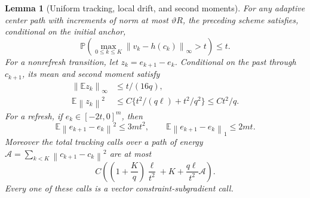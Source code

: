 \documentclass[11pt,a4paper]{article}
\newcommand{\E}{\mathbb E}
\newcommand{\Pp}{\mathbb P}
\newcommand{\norm}[1]{\left\lVert#1\right\rVert}
\newtheorem{lemma}[theorem]{Lemma}
\theoremstyle{remark}
\numberwithin{equation}{section}
\begin{document}
\begin{lemma}[Uniform tracking, local drift, and second moments]\label{lem:tracker}
For any adaptive center path with increments of norm at most $\vartheta R$, the preceding scheme satisfies, conditional on the initial anchor,
\begin{equation}
 \Pp\left(\max_{0\le k\le K}\norm{v_k-h(c_k)}_\infty>t\right)\le t.
 \label{eq:trackgood}
\end{equation}
For a nonrefresh transition, let $z_k=e_{k+1}-e_k$. Conditional on the past through $c_{k+1}$, its mean and second moment satisfy
\begin{align}
 \norm{\E z_k}_\infty&\le t/(16q),\label{eq:bias}\\
 \E\norm{z_k}^2&\le C\{t^2/(q\ell)+t^2/q^2\}\le Ct^2/q.
 \label{eq:incrementsecond}
\end{align}
For a refresh, if $e_k\in[-2t,0]^m$, then
\[
 \E\norm{e_{k+1}-e_k}^2\le3mt^2,
 \qquad \E\norm{e_{k+1}-e_k}_1\le2mt.
\]
Moreover the total tracking calls over a path of energy $\mathcal A=\sum_{k<K}\norm{c_{k+1}-c_k}^2$ are at most
\begin{equation}
 C\left(\left(1+\frac Kq\right)\frac\ell{t^2}+K+
 \frac{q\ell}{t^2}\mathcal A\right).
 \label{eq:trackcost}
\end{equation}
Every one of these calls is a vector constraint-subgradient call.
\end{lemma}
\end{document}
